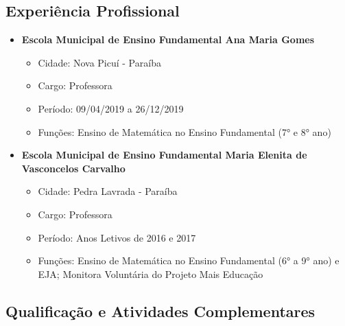 \documentclass[
  letterpaper,
  DIV=11,
  numbers=noendperiod]{scrartcl}
\providecommand{\tightlist}{%
  \setlength{\itemsep}{0pt}\setlength{\parskip}{0pt}}
\begin{document}
\subsection{Experiência Profissional}\label{experiuxeancia-profissional}

\begin{itemize}
\tightlist
\item
  \textbf{Escola Municipal de Ensino Fundamental Ana Maria Gomes}

  \begin{itemize}
  \tightlist
  \item
    Cidade: Nova Picuí - Paraíba
  \item
    Cargo: Professora
  \item
    Período: 09/04/2019 a 26/12/2019
  \item
    Funções: Ensino de Matemática no Ensino Fundamental (7° e 8° ano)
  \end{itemize}
\item
  \textbf{Escola Municipal de Ensino Fundamental Maria Elenita de
  Vasconcelos Carvalho}

  \begin{itemize}
  \tightlist
  \item
    Cidade: Pedra Lavrada - Paraíba
  \item
    Cargo: Professora
  \item
    Período: Anos Letivos de 2016 e 2017
  \item
    Funções: Ensino de Matemática no Ensino Fundamental (6° a 9° ano) e
    EJA; Monitora Voluntária do Projeto Mais Educação
  \end{itemize}
\end{itemize}

\subsection{Qualificação e Atividades
Complementares}\label{qualificauxe7uxe3o-e-atividades-complementares}
\end{document}
